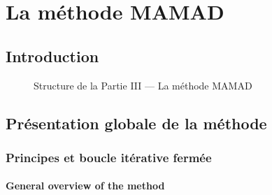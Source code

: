 \cleardoublepage
{}
\part{La méthode MAMAD}

\chapter*{Introduction}

\begin{figure}[h!]
    \centering
    \resizebox{\linewidth}{!}{%
        
    }
    \caption{Structure de la Partie III — La méthode MAMAD}
\end{figure}



\chapter{Présentation globale de la méthode}

\section{Principes et boucle itérative fermée}


\subsection{General overview of the method}

